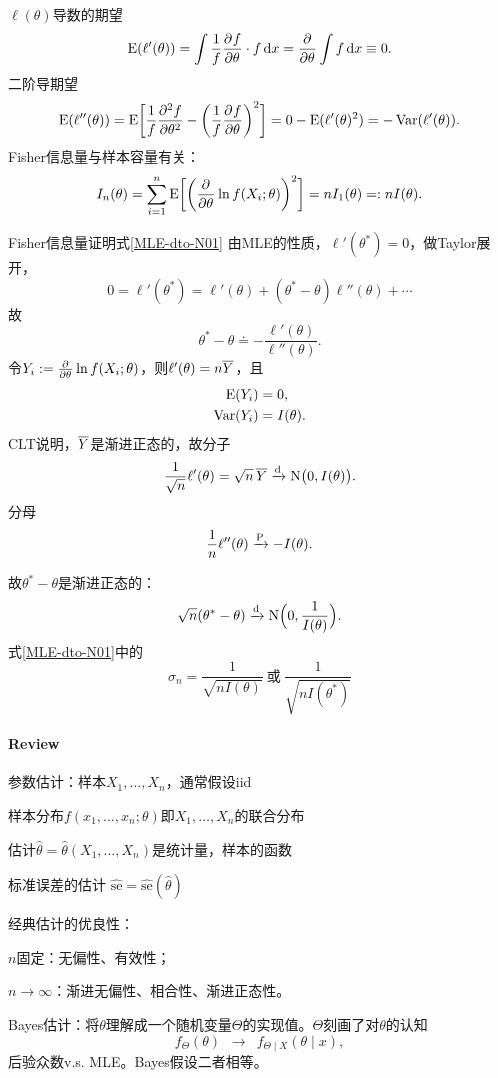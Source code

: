 $\ell(\theta)$导数的期望
\[
	\E(\ell'(\theta)) = \int\frac1f\pv f\theta \cdot f\d x = \pp\theta\int f\d x \equiv 0.
\]
二阶导期望
\begin{equation}\label{eq:ps-fisher-negative-hessian}
	\E(\ell''(\theta)) = \E\biggl[\frac1f\pv[2]f\theta - \biggl(\frac1f\pv f\theta\biggr)^2\biggr] = 0 - \E(\ell'(\theta)^2) = -\Var(\ell'(\theta)).
\end{equation}
Fisher信息量与样本容量有关：
\begin{equation}\label{eq:ps-fisher-additivity}
	I_n(\theta) = \sum_{i=1}^n\E\biggl[\biggl(\pp\theta\ln f(X_i;\theta)\biggr)^2\biggr] = nI_1(\theta) =: nI(\theta).
\end{equation}
\begin{example}{Fisher信息量证明式\eqref{MLE-dto-N01}}{}
	由MLE的性质，$\ell'(\theta^\ast) = 0$，做Taylor展开，
	\[
		0 = \ell'(\theta^\ast) = \ell'(\theta) + (\theta^\ast - \theta)\ell''(\theta) + \cdots
	\]
	故
	\[
		\theta^\ast - \theta \doteq -\frac{\ell'(\theta)}{\ell''(\theta)}.
	\]
	令$Y_i := \pp\theta\ln f(X_i;\theta)$，则$\ell'(\theta) = n\avg Y$，且
	\begin{align*}
		\E(Y_i) &= 0,\\
		\Var(Y_i) &= I(\theta).
	\end{align*}
	CLT说明，$\avg Y$是渐进正态的，故分子
	\[
		\frac1{\sqrt n}\ell'(\theta) = \sqrt n\,\avg Y \dto \NormalDist\bigp{0,I(\theta)}.
	\]
	分母
	\[
		\frac1n\ell''(\theta) \pto -I(\theta).
	\]

	故$\theta^\ast - \theta$是渐进正态的：
	\begin{equation}\label{eq:ps-mle-asymptotic-variance}
		\sqrt n(\theta^\ast - \theta) \dto \NormalDist\Bigp{0,\frac1{I(\theta)}}.
	\end{equation}
	式\eqref{MLE-dto-N01}中的 
	\[
		\sigma_n = \frac1{\sqrt{nI(\theta)}}~\text{或}~\frac1{\sqrt{nI(\theta^\ast)}}
	\]
\end{example}
\paragraph{Review}
\begin{compactenum}
	\item 参数估计：样本$X_1,\ldots,X_n$，通常假设iid
	
	样本分布$f(x_1,\ldots,x_n;\theta)$即$X_1,\ldots,X_n$的联合分布

	估计$\hat\theta = \hat\theta(X_1,\ldots,X_n)$是统计量，样本的函数

	标准误差的估计
	$\hat{\mathrm{se}} = \hat{\mathrm{se}}(\hat\theta)$
	\item 经典估计的优良性：
	
	$n$固定：无偏性、有效性；

	$n \to \infty$：渐进无偏性、相合性、渐进正态性。

	\item Bayes估计：将$\theta$理解成一个随机变量$\varTheta$的实现值。$\varTheta$刻画了对$\theta$的认知
	\[
		f_\varTheta(\theta)\enspace \to \enspace f_{\varTheta\mid X}(\theta \mid x),
	\]
	后验众数v.s. MLE。Bayes假设二者相等。
\end{compactenum}
